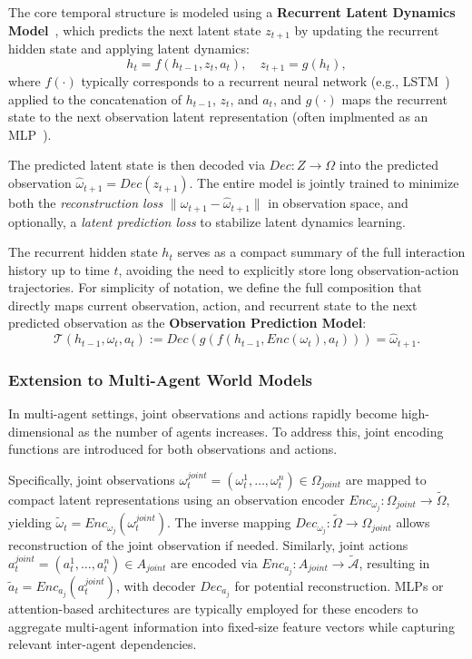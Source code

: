 \documentclass[pdflatex,sn-mathphys-num]{sn-jnl}%
\theoremstyle{thmstyleone}%
\theoremstyle{thmstyletwo}%
\theoremstyle{thmstylethree}%
\begin{document}
The core temporal structure is modeled using a \textbf{Recurrent Latent Dynamics Model}~\cite{hafner2020dream}, which predicts the next latent state $z_{t+1}$ by updating the recurrent hidden state and applying latent dynamics:
\[
    h_t = f(h_{t-1}, z_t, a_t), \quad
    z_{t+1} = g(h_t),
\]
where $f(\cdot)$ typically corresponds to a recurrent neural network (e.g., LSTM~\cite{hochreiter1997long}) applied to the concatenation of $h_{t-1}$, $z_t$, and $a_t$, and $g(\cdot)$ maps the recurrent state to the next observation latent representation (often implmented as an MLP~\cite{hochreiter1997long}).

The predicted latent state is then decoded via $Dec: Z \rightarrow \Omega$ into the predicted observation $\hat{\omega}_{t+1} = Dec(z_{t+1})$. The entire model is jointly trained to minimize both the \emph{reconstruction loss} $\|\omega_{t+1} - \hat{\omega}_{t+1}\|$ in observation space, and optionally, a \emph{latent prediction loss} to stabilize latent dynamics learning.

The recurrent hidden state $h_t$ serves as a compact summary of the full interaction history up to time $t$, avoiding the need to explicitly store long observation-action trajectories.
For simplicity of notation, we define the full composition that directly maps current observation, action, and recurrent state to the next predicted observation as the \textbf{Observation Prediction Model}:
\[
    \mathcal{T}(h_{t-1}, \omega_t, a_t) := Dec(g(f(h_{t-1}, Enc(\omega_t), a_t))) = \hat{\omega}_{t+1}.
\]

\subsubsection{Extension to Multi-Agent World Models}

In multi-agent settings, joint observations and actions rapidly become high-dimensional as the number of agents increases. To address this, joint encoding functions are introduced for both observations and actions.

Specifically, joint observations $\omega_t^{joint} = (\omega_t^1, \dots, \omega_t^n) \in \Omega_{joint}$ are mapped to compact latent representations using an observation encoder $Enc_{\omega_j}: \Omega_{joint} \rightarrow \tilde{\Omega}$, yielding $\tilde{\omega}_t = Enc_{\omega_j}(\omega_t^{joint})$. The inverse mapping $Dec_{\omega_j}: \tilde{\Omega} \rightarrow \Omega_{joint}$ allows reconstruction of the joint observation if needed. Similarly, joint actions $a_t^{joint} = (a_t^1, \dots, a_t^n) \in A_{joint}$ are encoded via $Enc_{a_j}: A_{joint} \rightarrow \tilde{\mathcal{A}}$, resulting in $\tilde{a}_t = Enc_{a_j}(a_t^{joint})$, with decoder $Dec_{a_j}$ for potential reconstruction.
%
MLPs or attention-based architectures are typically employed for these encoders to aggregate multi-agent information into fixed-size feature vectors while capturing relevant inter-agent dependencies.
\end{document}
